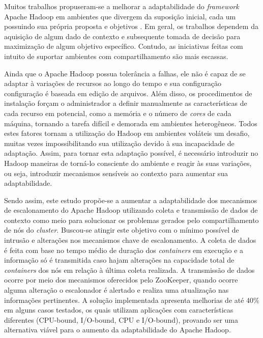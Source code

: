 Muitos trabalhos propuseram-se a melhorar a adaptabilidade do \textit{framework} Apache Hadoop em ambientes que divergem da suposição inicial, cada um possuindo sua própria proposta e objetivos \cite{Kumar2012} \cite{Zaharia2008} \cite{Rasooli2012} \cite{Sandholm2010} \cite{3PGCIC}. Em geral, os trabalhos dependem da aquisição de algum dado de contexto e subsequente tomada de decisão para maximização de algum objetivo específico. Contudo, as iniciativas feitas com intuito de suportar ambientes com compartilhamento são mais escassas.

Ainda que o Apache Hadoop possua tolerância a falhas, ele não é capaz de se adaptar à variações de recursos ao longo do tempo e sua configuração configuração é baseada em edição de arquivos. Além disso, os procedimentos de instalação forçam o administrador a definir manualmente as características de cada recurso em potencial, como a memória e o número de \textit{cores} de cada máquina, tornando a tarefa difícil e demorada em ambientes heterogêneos. Todos estes fatores tornam a utilização do Hadoop em ambientes voláteis um desafio, muitas vezes impossibilitando sua utilização devido à sua incapacidade de adaptação. Assim, para tornar esta adaptação possível, é necessário introduzir no Hadoop maneiras de torná-lo consciente do ambiente e reagir às suas variações, ou seja, introduzir mecanismos sensíveis ao contexto para aumentar sua adaptabilidade.

Sendo assim, este estudo propõe-se a aumentar a adaptabilidade dos mecanismos de escalonamento do Apache Hadoop utilizando coleta e transmissão de dados de contexto como meio para solucionar os problemas gerados pelo compartilhamento de nós do \textit{cluster}. Buscou-se atingir este objetivo com o mínimo possível de intrusão e alterações nos mecanismos chave de escalonamento. A coleta de dados é feita com base no tempo médio de duração dos \textit{containers} em execução e a informação só é transmitida caso hajam alterações na capacidade total de \textit{containers} dos nós em relação à última coleta realizada. A transmissão de dados ocorre por meio dos mecanismos oferecidos pelo ZooKeeper, quando ocorre alguma alteração o escalonador é alertado e realiza uma atualização nas informações pertinentes. A solução implementada apresenta melhorias de até 40\% em alguns casos testados, os quais utilizam aplicações com características diferentes (CPU-bound, I/O-bound, CPU e I/O-bound), provando ser uma alternativa viável para o aumento da adaptabilidade do Apache Hadoop.

